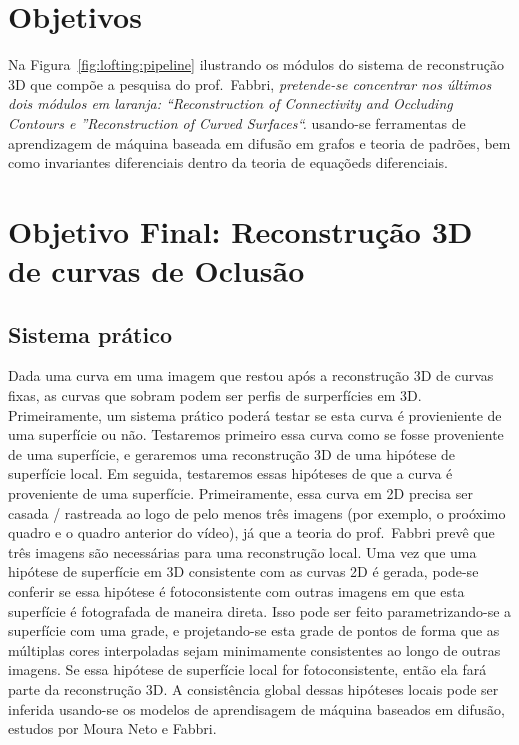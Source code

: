 \documentclass[a4paper,titlepage]{article}
\begin{document}
\section{Objetivos}

Na Figura~\ref{fig:lofting:pipeline} ilustrando os módulos do sistema de
reconstrução 3D que compõe a pesquisa do prof.\ Fabbri, \emph{pretende-se concentrar
nos últimos dois módulos em laranja: ``Reconstruction of Connectivity and
Occluding Contours e ''Reconstruction of Curved Surfaces``.}
usando-se ferramentas de aprendizagem de máquina baseada em
difusão em grafos e teoria de padrões, bem como invariantes diferenciais dentro
da teoria de equaçõeds diferenciais.


\section{Objetivo Final: Reconstrução 3D de curvas de Oclusão}

\subsection{Sistema prático}
Dada uma curva em uma imagem que restou após a reconstrução 3D de curvas fixas,
as curvas que sobram podem ser perfis de surperfícies em 3D. Primeiramente, um
sistema prático poderá testar se esta curva é provieniente de uma superfície ou
não.
Testaremos primeiro essa curva como se fosse proveniente de uma superfície, e
geraremos uma reconstrução 3D de uma hipótese de superfície local. Em seguida,
testaremos essas hipóteses de que a curva é proveniente de uma superfície.
Primeiramente, essa curva em 2D precisa ser casada / rastreada ao logo de pelo
menos três imagens (por exemplo, o proóximo quadro e o quadro anterior do
vídeo), já que a teoria do prof.\ Fabbri prevê que três imagens são necessárias
para uma reconstrução local. Uma vez que uma hipótese de superfície em 3D
consistente com as curvas 2D é gerada, pode-se conferir se essa hipótese é
fotoconsistente com outras imagens em que esta superfície é fotografada de
maneira direta. Isso pode ser feito parametrizando-se a superfície com uma
grade, e projetando-se esta grade de pontos de forma que as múltiplas cores
interpoladas sejam minimamente consistentes ao longo de outras imagens.
Se essa hipótese de superfície local for fotoconsistente, então ela fará parte
da reconstrução 3D. A consistência global dessas hipóteses locais pode ser
inferida usando-se os modelos de aprendisagem de máquina baseados em difusão,
estudos por Moura Neto e Fabbri. 
\end{document}
